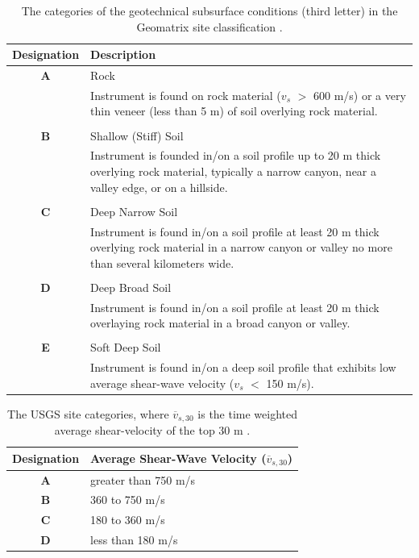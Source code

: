 \documentclass[11pt]{report}
\begin{document}
\begin{table}[tbp]
  \centering
  \begin{tabular}{cp{4in}}
	\hline\hline
	\textbf{Designation} & \textbf{Description} \\
	\hline
	\textbf{A}	& Rock \\
	& Instrument is found on rock material ($v_s$ $>$ 600 m/s) or a very thin veneer (less
	than 5 m) of soil overlying rock material.\\
	\\
	\textbf{B}	& Shallow (Stiff) Soil \\
	& Instrument is founded in/on a soil profile up to 20 m thick overlying rock
	material, typically a narrow canyon, near a valley edge, or on a hillside.\\
	\\
	\textbf{C}	& Deep Narrow Soil \\
	& Instrument is found in/on a soil profile at least 20 m thick overlying rock
	material in a narrow canyon or valley no more than several kilometers wide.\\
	\\
	\textbf{D}	& Deep Broad Soil \\
	& Instrument is found in/on a soil profile at least 20 m thick overlaying rock
	material in a broad canyon or valley.\\
	\\
	\textbf{E}	& Soft Deep Soil \\
	& Instrument is found in/on a deep soil profile that exhibits low average shear-wave
	velocity ($v_s$ $<$ 150 m/s).\\
	\hline\hline
  \end{tabular}
  \caption{The categories of the geotechnical subsurface conditions (third letter) in the Geomatrix
  site classification \citep{toro:95}.}
  \label{tab:rand:geomatrix}
\end{table}
\begin{table}[tbp]
  \centering
  \begin{tabular}{cl}
	\hline\hline
	\textbf{Designation} & \textbf{Average Shear-Wave Velocity} ($\overline{v}_{s,30}$)\\
	\hline
	\textbf{A} & greater than 750 m/s \\
	\textbf{B} & 360 to 750 m/s \\
	\textbf{C} & 180 to 360 m/s \\
	\textbf{D} & less than 180 m/s \\
	\hline\hline
  \end{tabular}
  \caption{The USGS site categories, where $\overline{v}_{s,30}$ is the time weighted average
  shear-velocity of the top 30 m \citep{toro:95}.}
  \label{tab:rand:usgs}
\end{table}
\end{document}
